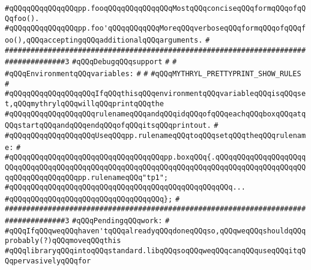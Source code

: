 \verb|#qQQqqQQqqQQqqQQqpp.fooqQQqqQQqqQQqqQQqMostqQQqconciseqQQqformqQQqofqQQqfoo().|\newline
\verb|#qQQqqQQqqQQqqQQqpp.foo'qQQqqQQqqQQqMoreqQQqverboseqQQqformqQQqofqQQqfoo(),qQQqacceptingqQQqadditionalqQQqarguments.|\newline
\verb|#|\newline
\verb|####################################################################################3|\newline
\verb|#qQQqDebugqQQqsupport|\newline
\verb|#|\newline
\verb|#|\newline
\verb|#qQQqEnvironmentqQQqvariables:|\newline
\verb|#|\newline
\verb|#|\newline
\verb|#qQQqMYTHRYL_PRETTYPRINT_SHOW_RULES|\newline
\verb|#|\newline
\verb|#qQQqqQQqqQQqqQQqqQQqIfqQQqthisqQQqenvironmentqQQqvariableqQQqisqQQqset,qQQqmythrylqQQqwillqQQqprintqQQqthe|\newline
\verb|#qQQqqQQqqQQqqQQqqQQqrulenameqQQqandqQQqidqQQqofqQQqeachqQQqboxqQQqatqQQqstartqQQqandqQQqendqQQqofqQQqitsqQQqprintout.|\newline
\verb|#|\newline
\verb|#qQQqqQQqqQQqqQQqqQQqUseqQQqpp.rulenameqQQqtoqQQqsetqQQqtheqQQqrulename:|\newline
\verb|#|\newline
\verb|#qQQqqQQqqQQqqQQqqQQqqQQqqQQqqQQqqQQqpp.boxqQQq{.qQQqqQQqqQQqqQQqqQQqqQQqqQQqqQQqqQQqqQQqqQQqqQQqqQQqqQQqqQQqqQQqqQQqqQQqqQQqqQQqqQQqqQQqqQQqqQQqqQQqqQQqqQQqpp.rulenameqQQq"tp1";|\newline
\verb|#qQQqqQQqqQQqqQQqqQQqqQQqqQQqqQQqqQQqqQQqqQQqqQQqqQQq...|\newline
\verb|#qQQqqQQqqQQqqQQqqQQqqQQqqQQqqQQqqQQq};|\newline
\verb|#|\newline
\verb|####################################################################################3|\newline
\verb|#qQQqPendingqQQqwork:|\newline
\verb|#|\newline
\verb|#qQQqIfqQQqweqQQqhaven'tqQQqalreadyqQQqdoneqQQqso,qQQqweqQQqshouldqQQqprobably(?)qQQqmoveqQQqthis|\newline
\verb|#qQQqlibraryqQQqintoqQQqstandard.libqQQqsoqQQqweqQQqcanqQQquseqQQqitqQQqpervasivelyqQQqfor|\newline
